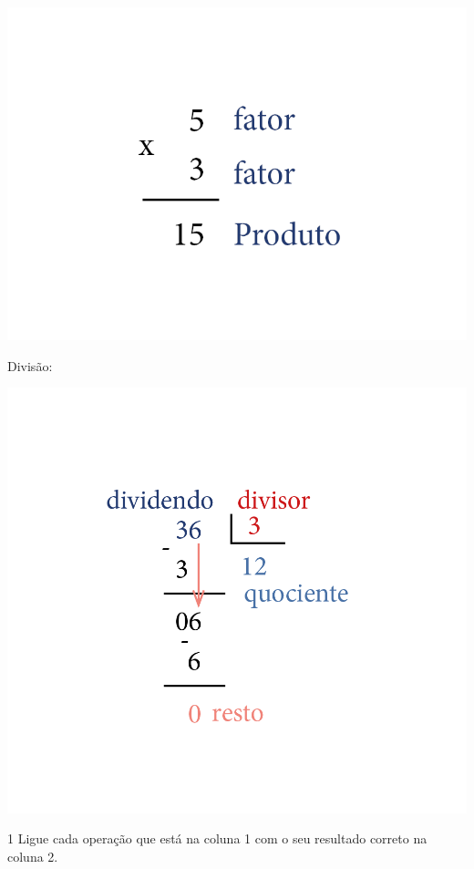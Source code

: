 {\includegraphics[width=\textwidth]{../ilustracoes/MAT5/SAEB_5ANO_MAT_figura16.png}

Divisão:

\includegraphics[width=\textwidth]{../ilustracoes/MAT5/SAEB_5ANO_MAT_figura17.png}
}


\num{1} Ligue cada operação que está na coluna 1 com o seu resultado correto na coluna 2.

